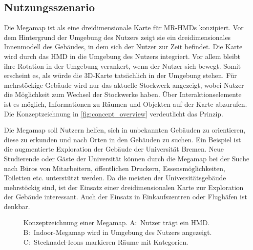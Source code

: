\subsection{Nutzungsszenario}
Die Megamap ist als eine dreidimensionale Karte für MR-HMDs konzipiert.
Vor dem Hintergrund der Umgebung des Nutzers zeigt sie ein dreidimensionales Innenmodell des Gebäudes, in dem sich der Nutzer zur Zeit befindet.
Die Karte wird durch das HMD in die Umgebung des Nutzers integriert.
Vor allem bleibt ihre Rotation in der Umgebung verankert, wenn der Nutzer sich bewegt.
Somit erscheint es, als würde die 3D-Karte tatsächlich in der Umgebung stehen.
Für mehrstöckige Gebäude wird nur das aktuelle Stockwerk angezeigt, wobei Nutzer die Möglichkeit zum Wechsel der Stockwerke haben.
Über Interaktionselemente ist es möglich, Informationen zu Räumen und Objekten auf der Karte abzurufen.
Die Konzeptzeichnung in \autoref{fig:concept_overview} verdeutlicht das Prinzip.

Die Megamap soll Nutzern helfen, sich in unbekannten Gebäuden zu orientieren, diese zu erkunden und nach Orten in den Gebäuden zu suchen.
Ein Beispiel ist die augmentierte Exploration der Gebäude der Universität Bremen.
Neue Studierende oder Gäste der Universität können durch die Megamap bei der Suche nach Büros von Mitarbeitern, öffentlichen Druckern, Essensmöglichkeiten, Toiletten etc. unterstützt werden.
Da die meisten der Universitätsgebäude mehrstöckig sind, ist der Einsatz einer dreidimensionalen Karte zur Exploration der Gebäude interessant.
Auch der Einsatz in Einkaufszentren oder Flughäfen ist denkbar.
\begin{figure}[bht]
	\centering
	\caption{Konzeptzeichnung einer Megamap. %
		A:~Nutzer trägt ein HMD. %
		B:~Indoor-Megamap wird in Umgebung des Nutzers angezeigt. %
		C:~Stecknadel-Icons markieren Räume mit Kategorien.}
	\label{fig:concept_overview}
\end{figure}

